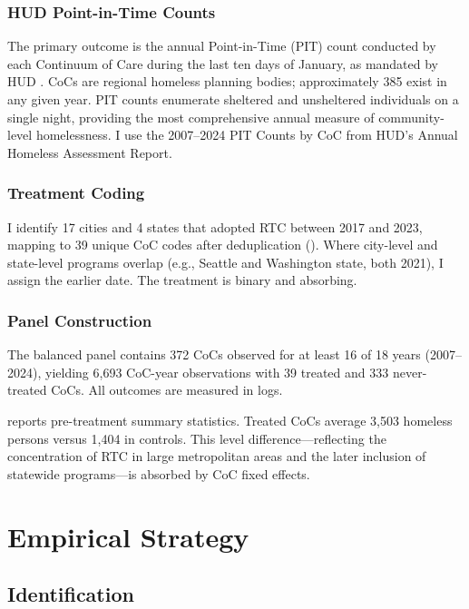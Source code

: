 \documentclass[12pt]{article}
\begin{document}
\subsubsection*{HUD Point-in-Time Counts} The primary outcome is the annual Point-in-Time (PIT) count conducted by each Continuum of Care during the last ten days of January, as mandated by HUD \citep{henry2024}. CoCs are regional homeless planning bodies; approximately 385 exist in any given year. PIT counts enumerate sheltered and unsheltered individuals on a single night, providing the most comprehensive annual measure of community-level homelessness. I use the 2007--2024 PIT Counts by CoC from HUD's Annual Homeless Assessment Report.

\subsubsection*{Treatment Coding} I identify 17 cities and 4 states that adopted RTC between 2017 and 2023, mapping to 39 unique CoC codes after deduplication (). Where city-level and state-level programs overlap (e.g., Seattle and Washington state, both 2021), I assign the earlier date. The treatment is binary and absorbing.

\subsubsection*{Panel Construction} The balanced panel contains 372 CoCs observed for at least 16 of 18 years (2007--2024), yielding 6,693 CoC-year observations with 39 treated and 333 never-treated CoCs. All outcomes are measured in logs.



 reports pre-treatment summary statistics. Treated CoCs average 3,503 homeless persons versus 1,404 in controls. This level difference---reflecting the concentration of RTC in large metropolitan areas and the later inclusion of statewide programs---is absorbed by CoC fixed effects.



\section{Empirical Strategy}
\label{sec:strategy}

\subsection{Identification}
\end{document}
